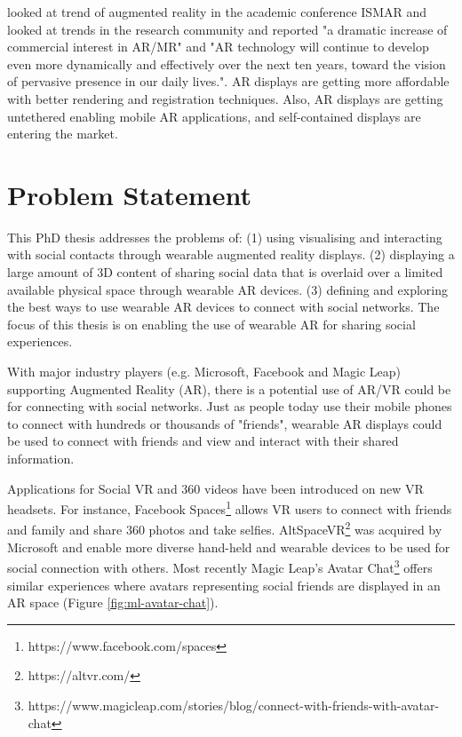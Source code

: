 \cite{Zhou2008, Kim2018} looked at trend of augmented reality in the academic conference ISMAR and looked at trends in the research community and reported "a dramatic increase of commercial interest in AR/MR" and "AR technology will continue to develop even more dynamically and effectively over the next ten years, toward the vision of pervasive presence in our daily lives.". AR displays are getting more affordable with better rendering and registration techniques. Also, AR displays are getting untethered enabling mobile AR applications, and self-contained displays are entering the market.

\section{Problem Statement}

This PhD thesis addresses the problems of: 
(1) using visualising and interacting with social contacts through wearable augmented reality displays. 
(2) displaying a large amount of 3D content of sharing social data that is overlaid over a limited available physical space through wearable AR devices. 
(3) defining and exploring the best ways to use wearable AR devices to connect with social networks.
The focus of this thesis is on enabling the use of wearable AR for sharing social experiences. 


With major industry players (e.g. Microsoft, Facebook and Magic Leap) supporting Augmented Reality (AR), there is a potential use of AR/VR could be for connecting with social networks. Just as people today use their mobile phones to connect with hundreds or thousands of "friends", wearable AR displays could be used to connect with friends and view and interact with their shared information.

Applications for Social VR and 360 videos have been introduced on new VR headsets. For instance, Facebook Spaces\footnote{https://www.facebook.com/spaces} allows VR users to connect with friends and family and share 360 photos and take selfies. AltSpaceVR\footnote{https://altvr.com/} was acquired by Microsoft and enable more diverse hand-held and wearable devices to be used for social connection with others. Most recently Magic Leap's Avatar Chat\footnote{https://www.magicleap.com/stories/blog/connect-with-friends-with-avatar-chat} offers similar experiences where avatars representing social friends are displayed in an AR space (Figure \ref{fig:ml-avatar-chat}). 


